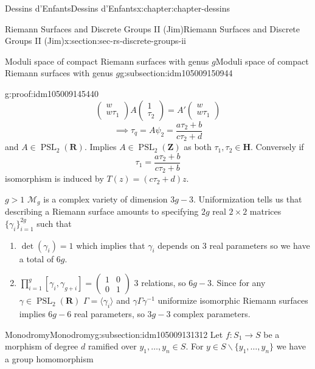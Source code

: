 \documentclass[oneside,10pt,]{book}
\numberwithin{equation}{section}
\newcommand{\inv}{^{-1}}
\newcommand{\lb}{[}
\newcommand{\rb}{]}
\newcommand{\ZZ}{\mathbf{Z}}
\newcommand{\RR}{\mathbf{R}}
\newcommand{\HH}{\mathbf{H}}
\DeclareMathOperator{\PSL}{PSL}
\newcommand{\gt}{>}
\newcommand{\amp}{&}
\begin{document}
\begin{chapterptx}{Dessins d'Enfants}{}{Dessins d'Enfants}{}{}{x:chapter:chapter-dessins}
\begin{sectionptx}{Riemann Surfaces and Discrete Groups II (Jim)}{}{Riemann Surfaces and Discrete Groups II (Jim)}{}{}{x:section:sec-rs-discrete-groups-ii}
\begin{subsectionptx}{Moduli space of compact Riemann surfaces with genus \(g\)}{}{Moduli space of compact Riemann surfaces with genus \(g\)}{}{}{g:subsection:idm105009150944}
\begin{proofptx}{}{g:proof:idm105009145440}
\begin{equation*}
\begin{pmatrix} w\\ w\tau_1 \end{pmatrix} A \begin{pmatrix}1\\ \tau_2\end{pmatrix} = A' \begin{pmatrix} w \\ w\tau_1 \end{pmatrix}
\end{equation*}
%
\begin{equation*}
\implies \tau_q = A \psi_2 = \frac{a\tau_2 + b}{c\tau_2 + d}
\end{equation*}
and \(A \in \PSL_2(\RR)\). Implies \(A\in \PSL_2(\ZZ)\) as both \(\tau_1,\tau_2 \in \HH\). Conversely if%
\begin{equation*}
\tau_1 = \frac{a\tau_2 + b}{c\tau_2 + b}
\end{equation*}
isomorphism is induced by \(T(z) = (c\tau_2 + d) z\).%
\end{proofptx}
\(g \gt 1\) \(\mathcal M_g\) is a complex variety of dimension \(3g-3\). Uniformization tells us that describing a Riemann surface amounts to specifying \(2g\) real \(2\times 2\) matrices \(\{\gamma_i\}_{i=1}^{2g}\) such that%
\begin{enumerate}
\item{}\(\det(\gamma_i) = 1\) which implies that \(\gamma_i\) depends on 3 real parameters so we have a total of \(6g\).%
\item{}\(\prod_{i=1}^g \lb \gamma_i, \gamma_{g+i}\rb = \begin{pmatrix} 1\amp 0 \\ 0\amp 1\end{pmatrix}\) 3 relations, so \(6g- 3\). Since for any \(\gamma \in \PSL_2(\RR)\) \(\Gamma = \langle \gamma_i \rangle\) and \(\gamma\Gamma \gamma\inv\) uniformize isomorphic Riemann surfaces implies \(6g-6\) real parameters, so \(3g-3\) complex parameters.%
\end{enumerate}
%
\end{subsectionptx}
%
%
\typeout{************************************************}
\typeout{************************************************}
%
\begin{subsectionptx}{Monodromy}{}{Monodromy}{}{}{g:subsection:idm105009131312}
Let \(f\colon S_1 \to S\) be a morphism of degree \(d\) ramified over \(y_1,\ldots, y_n \in S\). For \(y\in S\smallsetminus \{y_1,\ldots, y_n\}\) we have a group homomorphism%

\end{subsectionptx}
\end{sectionptx}
\end{chapterptx}
\end{document}
